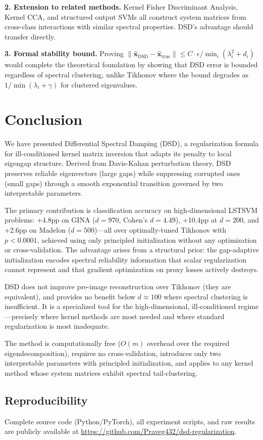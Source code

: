 \documentclass[journal]{IEEEtran}
\begin{document}
\textbf{2. Extension to related methods.} Kernel Fisher Discriminant Analysis, Kernel CCA, and structured output SVMs all construct system matrices from cross-class interactions with similar spectral properties. DSD's advantage should transfer directly.

\textbf{3. Formal stability bound.} Proving $\|\hat{\bm{x}}_{\text{DSD}} - \hat{\bm{x}}_{\text{true}}\| \leq C \cdot \epsilon / \min_i(\lambda_i^2 + d_i)$ would complete the theoretical foundation by showing that DSD error is bounded regardless of spectral clustering, unlike Tikhonov where the bound degrades as $1/\min(\lambda_i + \gamma)$ for clustered eigenvalues.


\section{Conclusion}
\label{sec:conclusion}

We have presented Differential Spectral Damping (DSD), a regularization formula for ill-conditioned kernel matrix inversion that adapts its penalty to local eigengap structure. Derived from Davis-Kahan perturbation theory, DSD preserves reliable eigenvectors (large gaps) while suppressing corrupted ones (small gaps) through a smooth exponential transition governed by two interpretable parameters.

The primary contribution is classification accuracy on high-dimensional LSTSVM problems: +4.8pp on GINA ($d{=}970$, Cohen's $d = 4.49$), +10.4pp at $d{=}200$, and +2.6pp on Madelon ($d{=}500$)---all over optimally-tuned Tikhonov with $p < 0.0001$, achieved using only principled initialization without any optimization or cross-validation. The advantage arises from a structural prior: the gap-adaptive initialization encodes spectral reliability information that scalar regularization cannot represent and that gradient optimization on proxy losses actively destroys.

DSD does not improve pre-image reconstruction over Tikhonov (they are equivalent), and provides no benefit below $d \approx 100$ where spectral clustering is insufficient. It is a specialized tool for the high-dimensional, ill-conditioned regime---precisely where kernel methods are most needed and where standard regularization is most inadequate.

The method is computationally free ($O(m)$ overhead over the required eigendecomposition), requires no cross-validation, introduces only two interpretable parameters with principled initialization, and applies to any kernel method whose system matrices exhibit spectral tail-clustering.

\subsection*{Reproducibility}
Complete source code (Python/PyTorch), all experiment scripts, and raw results are publicly available at \url{https://github.com/Praveg432/dsd-regularization}.



\end{document}
